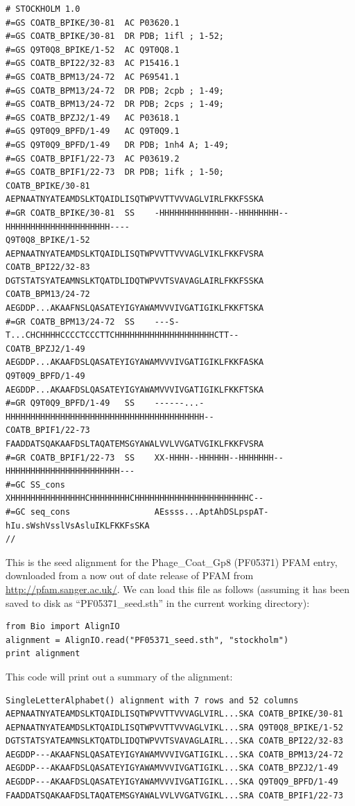 \documentclass{report}
\begin{document}
\begin{verbatim}
# STOCKHOLM 1.0
#=GS COATB_BPIKE/30-81  AC P03620.1
#=GS COATB_BPIKE/30-81  DR PDB; 1ifl ; 1-52;
#=GS Q9T0Q8_BPIKE/1-52  AC Q9T0Q8.1
#=GS COATB_BPI22/32-83  AC P15416.1
#=GS COATB_BPM13/24-72  AC P69541.1
#=GS COATB_BPM13/24-72  DR PDB; 2cpb ; 1-49;
#=GS COATB_BPM13/24-72  DR PDB; 2cps ; 1-49;
#=GS COATB_BPZJ2/1-49   AC P03618.1
#=GS Q9T0Q9_BPFD/1-49   AC Q9T0Q9.1
#=GS Q9T0Q9_BPFD/1-49   DR PDB; 1nh4 A; 1-49;
#=GS COATB_BPIF1/22-73  AC P03619.2
#=GS COATB_BPIF1/22-73  DR PDB; 1ifk ; 1-50;
COATB_BPIKE/30-81             AEPNAATNYATEAMDSLKTQAIDLISQTWPVVTTVVVAGLVIRLFKKFSSKA
#=GR COATB_BPIKE/30-81  SS    -HHHHHHHHHHHHHH--HHHHHHHH--HHHHHHHHHHHHHHHHHHHHH----
Q9T0Q8_BPIKE/1-52             AEPNAATNYATEAMDSLKTQAIDLISQTWPVVTTVVVAGLVIKLFKKFVSRA
COATB_BPI22/32-83             DGTSTATSYATEAMNSLKTQATDLIDQTWPVVTSVAVAGLAIRLFKKFSSKA
COATB_BPM13/24-72             AEGDDP...AKAAFNSLQASATEYIGYAWAMVVVIVGATIGIKLFKKFTSKA
#=GR COATB_BPM13/24-72  SS    ---S-T...CHCHHHHCCCCTCCCTTCHHHHHHHHHHHHHHHHHHHHCTT--
COATB_BPZJ2/1-49              AEGDDP...AKAAFDSLQASATEYIGYAWAMVVVIVGATIGIKLFKKFASKA
Q9T0Q9_BPFD/1-49              AEGDDP...AKAAFDSLQASATEYIGYAWAMVVVIVGATIGIKLFKKFTSKA
#=GR Q9T0Q9_BPFD/1-49   SS    ------...-HHHHHHHHHHHHHHHHHHHHHHHHHHHHHHHHHHHHHHHH--
COATB_BPIF1/22-73             FAADDATSQAKAAFDSLTAQATEMSGYAWALVVLVVGATVGIKLFKKFVSRA
#=GR COATB_BPIF1/22-73  SS    XX-HHHH--HHHHHH--HHHHHHH--HHHHHHHHHHHHHHHHHHHHHHH---
#=GC SS_cons                  XHHHHHHHHHHHHHHHCHHHHHHHHCHHHHHHHHHHHHHHHHHHHHHHHC--
#=GC seq_cons                 AEssss...AptAhDSLpspAT-hIu.sWshVsslVsAsluIKLFKKFsSKA
//
\end{verbatim}

This is the seed alignment for the Phage\_Coat\_Gp8 (PF05371) PFAM entry, downloaded from a now out of date release of PFAM from \url{http://pfam.sanger.ac.uk/}.  We can load this file as follows (assuming it has been saved to disk as ``PF05371\_seed.sth'' in the current working directory):

\begin{verbatim}
from Bio import AlignIO
alignment = AlignIO.read("PF05371_seed.sth", "stockholm")
print alignment
\end{verbatim}

\noindent This code will print out a summary of the alignment:

\begin{verbatim}
SingleLetterAlphabet() alignment with 7 rows and 52 columns
AEPNAATNYATEAMDSLKTQAIDLISQTWPVVTTVVVAGLVIRL...SKA COATB_BPIKE/30-81
AEPNAATNYATEAMDSLKTQAIDLISQTWPVVTTVVVAGLVIKL...SRA Q9T0Q8_BPIKE/1-52
DGTSTATSYATEAMNSLKTQATDLIDQTWPVVTSVAVAGLAIRL...SKA COATB_BPI22/32-83
AEGDDP---AKAAFNSLQASATEYIGYAWAMVVVIVGATIGIKL...SKA COATB_BPM13/24-72
AEGDDP---AKAAFDSLQASATEYIGYAWAMVVVIVGATIGIKL...SKA COATB_BPZJ2/1-49
AEGDDP---AKAAFDSLQASATEYIGYAWAMVVVIVGATIGIKL...SKA Q9T0Q9_BPFD/1-49
FAADDATSQAKAAFDSLTAQATEMSGYAWALVVLVVGATVGIKL...SRA COATB_BPIF1/22-73
\end{verbatim}
\end{document}
